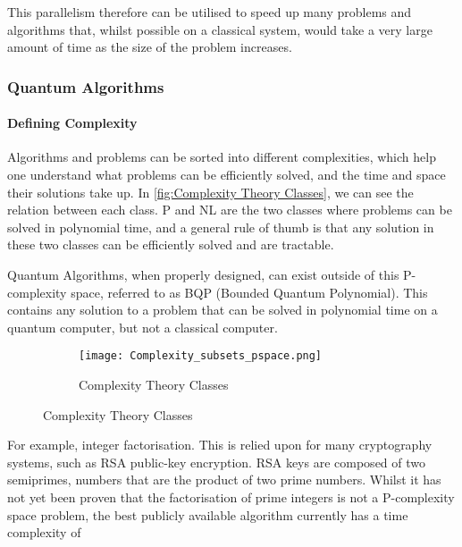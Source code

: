This parallelism therefore can be utilised to speed up many problems and algorithms that, whilst possible on a classical system, would take a very large amount of time as the size of the problem increases.

{}
\subsubsection*{Quantum Algorithms}

{}
\paragraph*{Defining Complexity}
\noindent
Algorithms and problems can be sorted into different complexities, which help one understand what problems can be efficiently solved, and the time and space their solutions take up. In \autoref{fig:Complexity Theory Classes}, we can see the relation between each class. P and NL are the two classes where problems can be solved in polynomial time, and a general rule of thumb is that any solution in these two classes can be efficiently solved and are tractable.

Quantum Algorithms, when properly designed, can exist outside of this P-complexity space, referred to as BQP (Bounded Quantum Polynomial). This contains any solution to a problem that can be solved in polynomial time on a quantum computer, but not a classical computer. \cite{doi:10.1137/S0097539796300921}

\begin{figure}
	\begin{figure}[H]
		\centering
		\texttt{[image: Complexity\_subsets\_pspace.png]}
		\caption{Complexity Theory Classes \cite{complexity}}
		\label{fig:Complexity Theory Classes}
	\end{figure}

\end{figure}

For example, integer factorisation. This is relied upon for many cryptography systems, such as RSA public-key encryption. RSA keys are composed of two semiprimes, numbers that are the product of two prime numbers. Whilst it has not yet been proven that the factorisation of prime integers is not a P-complexity space problem, the best publicly available algorithm currently has a time complexity of

